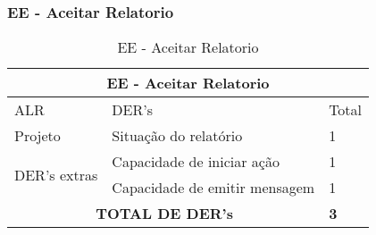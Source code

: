         \subsubsection{EE - Aceitar Relatorio}
  \begin{table}[!h]
\centering
\caption{EE - Aceitar Relatorio}
\label{ee_aceitar_relatorio_parcial}
\begin{tabular}{|l|l|l|}
\multicolumn{3}{c}{EE - Aceitar Relatorio}           \\\hline
ALR                      & DER's                      & Total         \\ \hline
Projeto                  & Situação do relatório      & 1             \\\hline
  \multirow{2}{*}{DER's extras} & Capacidade de iniciar ação             & 1 \\ \cline{2-3}
                 & Capacidade de emitir mensagem& 1 \\ \hline
\multicolumn{2}{|c|}{\textbf{TOTAL DE DER's}}                    & \textbf{3} \\ \hline
\end{tabular}
\end{table}
